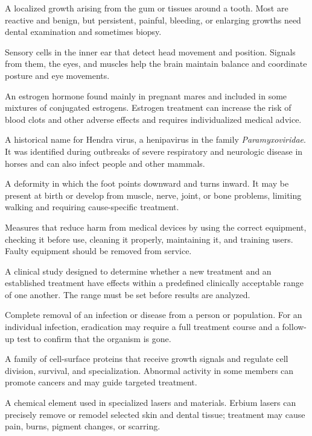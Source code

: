  A localized growth arising from the gum or tissues around a tooth. Most are reactive and benign, but persistent, painful, bleeding, or enlarging growths need dental examination and sometimes biopsy.

 Sensory cells in the inner ear that detect head movement and position. Signals from them, the eyes, and muscles help the brain maintain balance and coordinate posture and eye movements.

 An estrogen hormone found mainly in pregnant mares and included in some mixtures of conjugated estrogens. Estrogen treatment can increase the risk of blood clots and other adverse effects and requires individualized medical advice.

 A historical name for Hendra virus, a henipavirus in the family \textit{Paramyxoviridae}. It was identified during outbreaks of severe respiratory and neurologic disease in horses and can also infect people and other mammals.

 A deformity in which the foot points downward and turns inward. It may be present at birth or develop from muscle, nerve, joint, or bone problems, limiting walking and requiring cause-specific treatment.

 Measures that reduce harm from medical devices by using the correct equipment, checking it before use, cleaning it properly, maintaining it, and training users. Faulty equipment should be removed from service.

 A clinical study designed to determine whether a new treatment and an established treatment have effects within a predefined clinically acceptable range of one another. The range must be set before results are analyzed.

 Complete removal of an infection or disease from a person or population. For an individual infection, eradication may require a full treatment course and a follow-up test to confirm that the organism is gone.

 A family of cell-surface proteins that receive growth signals and regulate cell division, survival, and specialization. Abnormal activity in some members can promote cancers and may guide targeted treatment.

 A chemical element used in specialized lasers and materials. Erbium lasers can precisely remove or remodel selected skin and dental tissue; treatment may cause pain, burns, pigment changes, or scarring.

